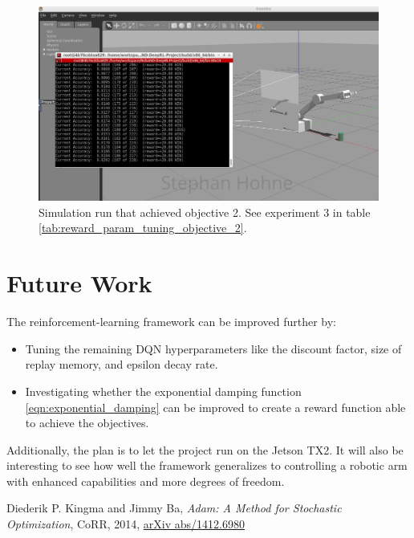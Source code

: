 \documentclass[11pt, onecolumn, oneside, reqno]{amsart}
\begin{document}
\begin{figure}[htpb]
      \centering
      \includegraphics[width=\linewidth]{images/228_signed.PNG}
      \caption{Simulation run that achieved objective 2. See experiment 3 in table \ref{tab:reward_param_tuning_objective_2}.}
      \label{fig:objective_2_achieved}
\end{figure}

\section{Future Work}
The reinforcement-learning framework can be improved further by:
\begin{itemize}
\item Tuning the remaining DQN hyperparameters like the discount factor, size of replay memory, and epsilon decay rate.
\item Investigating whether the exponential damping function \ref{eqn:exponential_damping} can be improved to create a reward function able to achieve the objectives. 
\end{itemize}

Additionally, the plan is to let the project run on the Jetson TX2. It will also be interesting to see how well the framework generalizes to controlling a robotic arm with enhanced capabilities and more degrees of freedom.

\begin{thebibliography}{1}
Diederik P. Kingma and Jimmy Ba, \textit{Adam: {A} Method for Stochastic Optimization}, CoRR, 2014, \href{http://arxiv.org/abs/1412.6980}{arXiv  abs/1412.6980}
\end{thebibliography}
\end{document}
